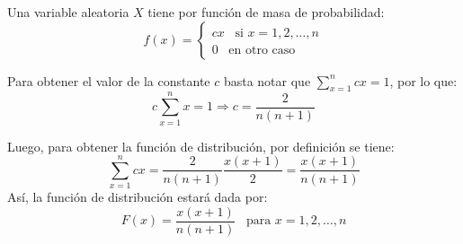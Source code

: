 
\addpoints
\question Una variable aleatoria $X$ tiene por función de masa de probabilidad:
$$f(x)=
\begin{cases}
cx \hspace{10pt} \text{si } x=1,2,\dots,n\\
0 \hspace{10pt} \text{en otro caso}
\end{cases}
$$
\noaddpoints
{}
\begin{solution}
Para obtener el valor de la constante $c$ basta notar que $\sum_{x=1}^{n} cx = 1$, por lo que:
$$c\sum_{x=1}^{n}x=1 \Rightarrow c=\dfrac{2}{n(n+1)}$$

Luego, para obtener la función de distribución, por definición se tiene:
$$\sum_{x=1}^{n} c x = \dfrac{2}{n(n+1)} \dfrac{x(x+1)}{2}= \dfrac{x(x+1)}{n(n+1)}$$
Así, la función de distribución estará dada por:
$$F(x)=\dfrac{x(x+1)}{n(n+1)}\hspace{10pt} \text{para } x=1,2,\dots,n$$
\end{solution}
